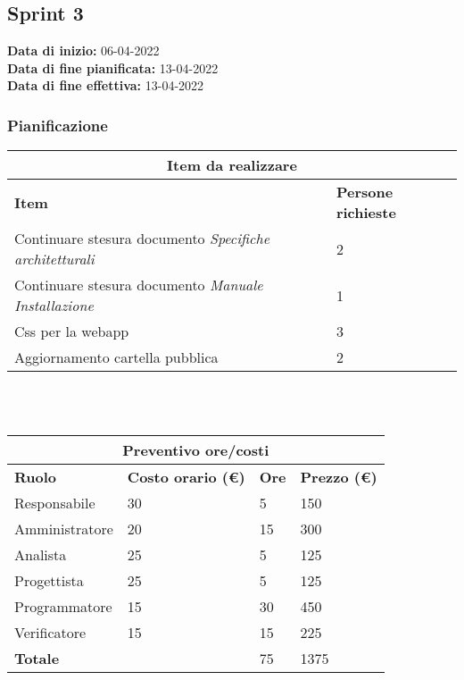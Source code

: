 \documentclass[a4paper, 12pt]{article}
\begin{document}
\subsection{Sprint 3}
\textbf{Data di inizio:} 06-04-2022\\
\textbf{Data di fine pianificata:} 13-04-2022\\
\textbf{Data di fine effettiva:} 13-04-2022

\subsubsection{Pianificazione}\mbox{}

\begin{center}
    \begin{tabularx}{\textwidth}{|X|X|}
        \hline
        \multicolumn{2}{|c|}{\textbf{Item da realizzare}}\\
        \hline
        \hline
        \textbf{Item} & \textbf{Persone richieste}\\
        \hline
        Continuare stesura documento \textit{Specifiche architetturali} & 2\\
        \hline
        Continuare stesura documento \textit{Manuale Installazione} & 1\\
        \hline
        Css per la webapp & 3\\
        \hline
        Aggiornamento cartella pubblica & 2\\
        \hline
    \end{tabularx}\\[8pt]
    \mbox{}\\
\end{center}

\begin{center}
    \begin{tabularx}{\textwidth}{|X|X|X|X|}
        \hline
        \multicolumn{4}{|c|}{\textbf{Preventivo ore/costi}}\\
        \hline
        \hline
        \textbf{Ruolo} & \textbf{Costo orario (\euro)} & \textbf{Ore} & \textbf{Prezzo (\euro)}\\
        \hline
        Responsabile    & 30 & 5  & 150\\
        \hline
        Amministratore  & 20 & 15  & 300\\
        \hline
        Analista        & 25 & 5  & 125\\
        \hline
        Progettista     & 25 & 5  & 125\\
        \hline
        Programmatore   & 15 & 30  & 450\\
        \hline
        Verificatore    & 15 & 15  & 225\\
        \hline
        \hline
        \textbf{Totale} &    & 75 & 1375\\
        \hline
    \end{tabularx}\\[8pt]
    \mbox{}\\
\end{center}
\end{document}
